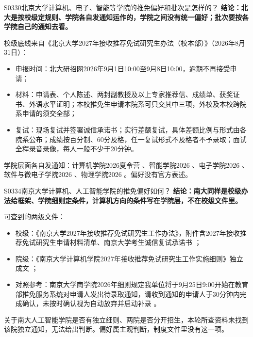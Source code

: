 \begin{qa}{S0330}{北京大学计算机、电子、智能等学院的推免偏好和批次是怎样的？}
\textbf{结论：北大是按校级定规则、学院各自发通知运作的，学院之间没有统一偏好；批次要按各学院自己的通知去看。}

校级底线来自《北京大学2027年接收推荐免试研究生办法（校本部）》（2026年8月31日）：

\begin{itemize}
  \item 申报时间：北大研招网2026年9月1日10:00至9月8日10:00，逾期不再接受申请；
  \item 材料：申请表、个人陈述、两封副教授及以上专家推荐信、成绩单、获奖证书、外语水平证明；本校推免生申请本院系可只交其中三项，外校及本校跨院系申请的须交全部；
  \item 复试：现场复试并签署诚信承诺书；实行差额复试，具体差额比例与形式由各院系公布；成绩按百分制、60分及格，任一复试形式不及格者不予录取；面试全程录音录像，每人一般不少于20分钟。
\end{itemize}

学院层面各自发通知：计算机学院2026夏令营 、智能学院2026 、电子学院2026 、软件与微电子学院2026 、物理学院2026 。偏好没有官方表述。
\end{qa}

\begin{qa}{S0334}{南京大学计算机、人工智能学院的推免偏好如何？}
\textbf{结论：南大同样是校级办法给框架、学院细则定条件，计算机方向的条件写在学院层，不在校级文件里。}

可查到的两级文件：

\begin{itemize}
  \item 校级：《南京大学2027年接收推荐免试研究生工作办法》，附件含2027年接收推荐免试研究生申请材料清单、南京大学考生诚信复试承诺书 ；
  \item 院级：《南京大学计算机学院2027年接收推荐免试研究生工作实施细则》独立成文 ；
  \item 对照参考：南京大学商学院2026年细则规定我单位将于9月25日9:00开始在教育部推免服务系统对申请人发出待录取通知，请收到通知的申请人于30分钟内完成确认，未按时确认视为自动放弃并启动补录 。
\end{itemize}

关于南大人工智能学院是否有独立细则、两院是否分开招生，本轮所查资料未找到该院独立通知，无法给出判断。偏好属主观判断，制度文件里没有这一项。
\end{qa}

